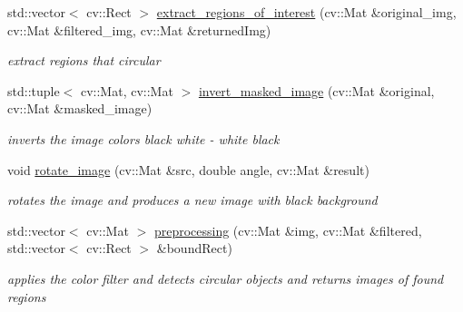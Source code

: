 \begin{DoxyCompactItemize}
std\+::vector$<$ cv\+::\+Rect $>$ \mbox{\hyperlink{class_character___recognition___algorithm_a21924694ba0aacb82054ea33191cb52a}{extract\+\_\+regions\+\_\+of\+\_\+interest}} (cv\+::\+Mat \&original\+\_\+img, cv\+::\+Mat \&filtered\+\_\+img, cv\+::\+Mat \&returned\+Img)
\begin{DoxyCompactList}\small\item\em extract regions that circular \end{DoxyCompactList}\item 
\mbox{\label{class_character___recognition___algorithm_a75ff23b5b2722c9c572091755985e137}} 
std\+::tuple$<$ cv\+::\+Mat, cv\+::\+Mat $>$ \mbox{\hyperlink{class_character___recognition___algorithm_a75ff23b5b2722c9c572091755985e137}{invert\+\_\+masked\+\_\+image}} (cv\+::\+Mat \&original, cv\+::\+Mat \&masked\+\_\+image)
\begin{DoxyCompactList}\small\item\em inverts the image colors black white -\/ white black \end{DoxyCompactList}\item 
\mbox{\label{class_character___recognition___algorithm_a4f7714bd67ad5804c909859b8eb5b8c6}} 
void \mbox{\hyperlink{class_character___recognition___algorithm_a4f7714bd67ad5804c909859b8eb5b8c6}{rotate\+\_\+image}} (cv\+::\+Mat \&src, double angle, cv\+::\+Mat \&result)
\begin{DoxyCompactList}\small\item\em rotates the image and produces a new image with black background \end{DoxyCompactList}\item 
\mbox{\label{class_character___recognition___algorithm_aa05c6fd498c38bf7725a445f15c5b77b}} 
std\+::vector$<$ cv\+::\+Mat $>$ \mbox{\hyperlink{class_character___recognition___algorithm_aa05c6fd498c38bf7725a445f15c5b77b}{preprocessing}} (cv\+::\+Mat \&img, cv\+::\+Mat \&filtered, std\+::vector$<$ cv\+::\+Rect $>$ \&bound\+Rect)
\begin{DoxyCompactList}\small\item\em applies the color filter and detects circular objects and returns images of found regions \end{DoxyCompactList}\item 
\mbox{\label{class_character___recognition___algorithm_a06c2a31ba8f4ab6e3aacea6b643a4d7d}} 

\end{DoxyCompactItemize}
